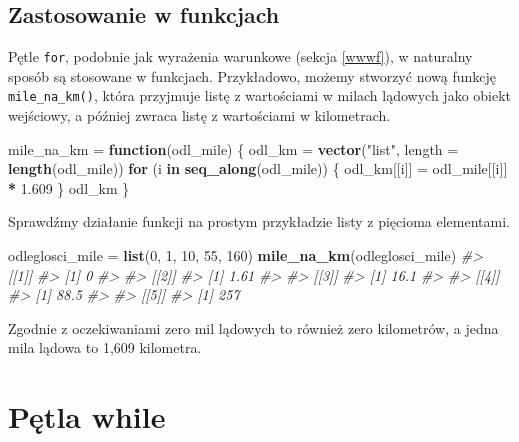 \documentclass[paper=6in:9in,pagesize=pdftex,headinclude=on,footinclude=on,10pt]{scrbook}
\newenvironment{Shaded}{\begin{snugshade}}{\end{snugshade}}
\newcommand{\CommentTok}[1]{\textcolor[rgb]{0.56,0.35,0.01}{\textit{#1}}}
\newcommand{\ControlFlowTok}[1]{\textcolor[rgb]{0.13,0.29,0.53}{\textbf{#1}}}
\newcommand{\DataTypeTok}[1]{\textcolor[rgb]{0.13,0.29,0.53}{#1}}
\newcommand{\DecValTok}[1]{\textcolor[rgb]{0.00,0.00,0.81}{#1}}
\newcommand{\FloatTok}[1]{\textcolor[rgb]{0.00,0.00,0.81}{#1}}
\newcommand{\KeywordTok}[1]{\textcolor[rgb]{0.13,0.29,0.53}{\textbf{#1}}}
\newcommand{\NormalTok}[1]{#1}
\newcommand{\OperatorTok}[1]{\textcolor[rgb]{0.81,0.36,0.00}{\textbf{#1}}}
\newcommand{\StringTok}[1]{\textcolor[rgb]{0.31,0.60,0.02}{#1}}
\begin{document}
\hypertarget{zastosowanie-w-funkcjach}{%
\subsection{Zastosowanie w funkcjach}\label{zastosowanie-w-funkcjach}}

Pętle \texttt{for}, podobnie jak wyrażenia warunkowe (sekcja \ref{wwwf}), w naturalny sposób są stosowane w funkcjach.
Przykładowo, możemy stworzyć nową funkcję \texttt{mile\_na\_km()}, która przyjmuje listę z wartościami w milach lądowych jako obiekt wejściowy, a później zwraca listę z wartościami w kilometrach.

\begin{Shaded}
\begin{Highlighting}[]
\NormalTok{mile_na_km =}\StringTok{ }\ControlFlowTok{function}\NormalTok{(odl_mile) \{}
\NormalTok{  odl_km =}\StringTok{ }\KeywordTok{vector}\NormalTok{(}\StringTok{"list"}\NormalTok{, }\DataTypeTok{length =} \KeywordTok{length}\NormalTok{(odl_mile))}
  \ControlFlowTok{for}\NormalTok{ (i }\ControlFlowTok{in} \KeywordTok{seq_along}\NormalTok{(odl_mile)) \{}
\NormalTok{    odl_km[[i]] =}\StringTok{ }\NormalTok{odl_mile[[i]] }\OperatorTok{*}\StringTok{ }\FloatTok{1.609}
\NormalTok{  \}}
\NormalTok{  odl_km}
\NormalTok{\}}
\end{Highlighting}
\end{Shaded}

Sprawdźmy działanie funkcji na prostym przykładzie listy z pięcioma elementami.

\begin{Shaded}
\begin{Highlighting}[]
\NormalTok{odleglosci_mile =}\StringTok{ }\KeywordTok{list}\NormalTok{(}\DecValTok{0}\NormalTok{, }\DecValTok{1}\NormalTok{, }\DecValTok{10}\NormalTok{, }\DecValTok{55}\NormalTok{, }\DecValTok{160}\NormalTok{)}
\KeywordTok{mile_na_km}\NormalTok{(odleglosci_mile)}
\CommentTok{#> [[1]]}
\CommentTok{#> [1] 0}
\CommentTok{#> }
\CommentTok{#> [[2]]}
\CommentTok{#> [1] 1.61}
\CommentTok{#> }
\CommentTok{#> [[3]]}
\CommentTok{#> [1] 16.1}
\CommentTok{#> }
\CommentTok{#> [[4]]}
\CommentTok{#> [1] 88.5}
\CommentTok{#> }
\CommentTok{#> [[5]]}
\CommentTok{#> [1] 257}
\end{Highlighting}
\end{Shaded}

Zgodnie z oczekiwaniami zero mil lądowych to również zero kilometrów, a jedna mila lądowa to 1,609 kilometra.

\hypertarget{petla-while}{%
\section{Pętla while}\label{petla-while}}
\end{document}
